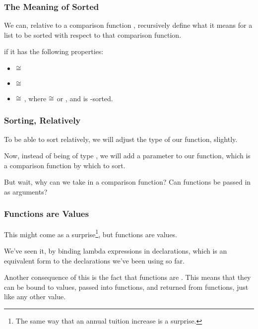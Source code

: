 \documentclass[aspectratio=169, handout]{beamer}
\begin{document}
\begin{frame}[fragile]
  \frametitle{The Meaning of Sorted}

  \rprs

  We can, relative to a comparison function , recursively
  define what it means for a list to be sorted with respect to that comparison
  function.

  \pause
  \vspace{\fill}

   if
  it has the following properties:

  \pause
  \begin{itemize}
    \item {} $\cong$ \code{[]}
    \item {} $\cong$ \code{[x]}
    \item {} $\cong$ , where  $\cong$
     or , and  is -sorted.
  \end{itemize}
\end{frame}

\begin{frame}[fragile]
  \frametitle{Sorting, Relatively}

  To be able to sort relatively, we will adjust the type of our 
  function, slightly.

  \pause
  \vspace{\fill}

  Now, instead of being of type , we will add a parameter
  to our  function, which is a comparison function by which to sort.

  \pause
  \vspace{\fill}

  But wait, why can we take in a comparison function? Can functions be passed in as arguments?
\end{frame}

\begin{frame}[fragile]
  \frametitle{Functions are Values}

  This might come as a surprise\footnote{The same way that an annual tuition increase is a surprise.},
  but functions are values.

  \pause
  \vspace{\fill}

  We've seen it, by binding lambda expressions in  declarations, which
  is an equivalent form to the  declarations we've been using so far.

  \pause
  \vspace{\fill}

  Another consequence of this is the fact that functions are .
  This means that they can be bound to values, passed into functions, and returned
  from functions, just like any other value.
\end{frame}
\end{document}
